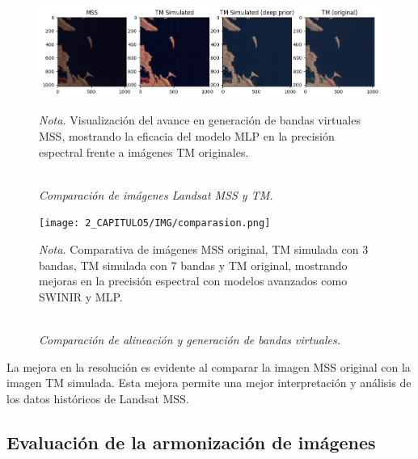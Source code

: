             

            \begin{figure}[H] 
                \caption{\doublespacing \\ \textit{Comparación de imágenes Landsat MSS y TM.}} 
                \centering
                \includegraphics[width=1\linewidth]{2_CAPITULO5/IMG/bandas.png}
                \begin{justify}
                    \textit{Nota.} Visualización del avance en generación de bandas virtuales MSS, mostrando la eficacia del modelo MLP en la precisión espectral frente a imágenes TM originales.
                \end{justify}                    
                \label{bandas}
            \end{figure}

            \begin{figure}[H] 
                \caption{\doublespacing \\ \textit{Comparación de alineación y generación de bandas virtuales.}} 
                \centering
                \texttt{[image: 2\_CAPITULO5/IMG/comparasion.png]}
                \begin{justify}
                    \textit{Nota.} Comparativa de imágenes MSS original, TM simulada con 3 bandas, TM simulada con 7 bandas y TM original, mostrando mejoras en la precisión espectral con modelos avanzados como SWINIR y MLP.
                \end{justify}                    
                \label{bandas2}
            \end{figure}

            La mejora en la resolución es evidente al comparar la imagen MSS original con la imagen TM simulada. Esta mejora permite una mejor interpretación y análisis de los datos históricos de Landsat MSS.

        \subsection{Evaluación de la armonización de imágenes}

